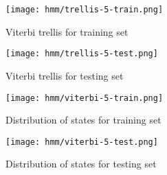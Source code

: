 \documentclass[12pt,a4paper]{article}
\begin{document}
\begin{figure}[H]
  \centering
  \texttt{[image: hmm/trellis-5-train.png]}
  \caption{Viterbi trellis for training set}  
\end{figure}

\begin{figure}[H]
  \texttt{[image: hmm/trellis-5-test.png]}
  \caption{Viterbi trellis for testing set}  
\end{figure}

\begin{figure}[H]
  \centering
  \texttt{[image: hmm/viterbi-5-train.png]}
  \caption{Distribution of states for training set}  
\end{figure}

\begin{figure}[H]
  \texttt{[image: hmm/viterbi-5-test.png]}
  \caption{Distribution of states for testing set}  
\end{figure}
\end{document}

